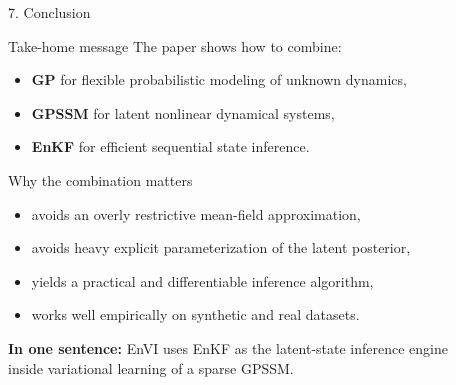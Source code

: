 \documentclass[aspectratio=169,11pt]{beamer}
\begin{document}
\begin{frame}{7. Conclusion}
\begin{block}{Take-home message}
The paper shows how to combine:
\begin{itemize}
  \item \textbf{GP} for flexible probabilistic modeling of unknown dynamics,
  \item \textbf{GPSSM} for latent nonlinear dynamical systems,
  \item \textbf{EnKF} for efficient sequential state inference.
\end{itemize}
\end{block}

\vspace{1mm}
\begin{block}{Why the combination matters}
\begin{itemize}
  \item avoids an overly restrictive mean-field approximation,
  \item avoids heavy explicit parameterization of the latent posterior,
  \item yields a practical and differentiable inference algorithm,
  \item works well empirically on synthetic and real datasets.
\end{itemize}
\end{block}

\vspace{1mm}
\begin{center}
\normalsize \textbf{In one sentence:} EnVI uses EnKF as the latent-state inference engine\\[1mm]
inside variational learning of a sparse GPSSM.
\end{center}
\end{frame}
\end{document}
